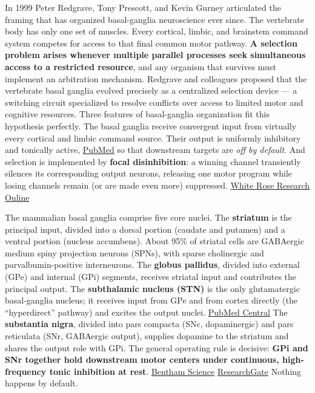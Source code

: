 In 1999 Peter Redgrave, Tony Prescott, and Kevin Gurney articulated the framing that has organized basal-ganglia neuroscience ever since. The vertebrate body has only one set of muscles. Every cortical, limbic, and brainstem command system competes for access to that final common motor pathway. \textbf{A selection problem arises whenever multiple parallel processes seek simultaneous access to a restricted resource}, and any organism that survives must implement an arbitration mechanism. Redgrave and colleagues proposed that the vertebrate basal ganglia evolved precisely as a centralized selection device --- a switching circuit specialized to resolve conflicts over access to limited motor and cognitive resources. Three features of basal-ganglia organization fit this hypothesis perfectly. The basal ganglia receive convergent input from virtually every cortical and limbic command source. Their output is uniformly inhibitory and tonically active, \href{https://pubmed.ncbi.nlm.nih.gov/23318875/}{PubMed} so that downstream targets are \emph{off by default}. And selection is implemented by \textbf{focal disinhibition}: a winning channel transiently silences its corresponding output neurons, releasing one motor program while losing channels remain (or are made even more) suppressed. \href{https://eprints.whiterose.ac.uk/id/eprint/107033/1/Redgrave\%20Neuroscience\%201999\%20preprint.pdf}{White Rose Research Online}

The mammalian basal ganglia comprise five core nuclei. The \textbf{striatum} is the principal input, divided into a dorsal portion (caudate and putamen) and a ventral portion (nucleus accumbens). About 95\% of striatal cells are GABAergic medium spiny projection neurons (SPNs), with sparse cholinergic and parvalbumin-positive interneurons. The \textbf{globus pallidus}, divided into external (GPe) and internal (GPi) segments, receives striatal input and contributes the principal output. The \textbf{subthalamic nucleus (STN)} is the only glutamatergic basal-ganglia nucleus; it receives input from GPe and from cortex directly (the ``hyperdirect'' pathway) and excites the output nuclei. \href{https://pmc.ncbi.nlm.nih.gov/articles/PMC4771745/}{PubMed Central} The \textbf{substantia nigra}, divided into pars compacta (SNc, dopaminergic) and pars reticulata (SNr, GABAergic output), supplies dopamine to the striatum and shares the output role with GPi. The general operating rule is decisive: \textbf{GPi and SNr together hold downstream motor centers under continuous, high-frequency tonic inhibition at rest}. \href{https://www.eurekaselect.com/article/133535}{Bentham Science} \href{https://www.researchgate.net/publication/228035209_Anatomy_of_the_Corpus_Striatum_and_Brain_Stem_Integrating_Systems}{ResearchGate} Nothing happens by default.

